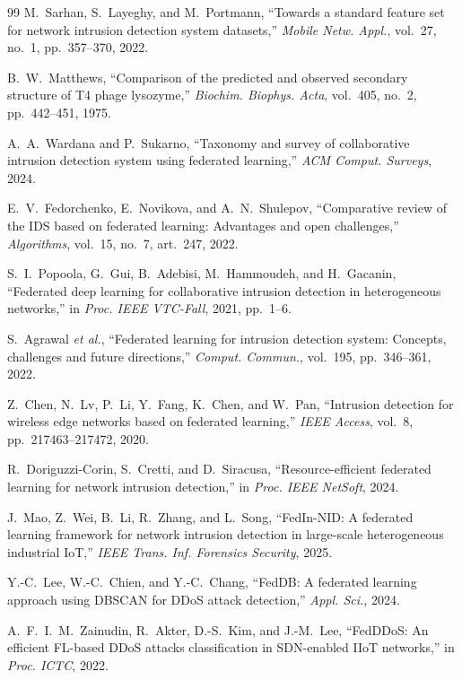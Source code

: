 \documentclass[11pt,a4paper]{article}
\begin{document}
\begin{thebibliography}{99}
M.~Sarhan, S.~Layeghy, and M.~Portmann, ``Towards a standard feature set for
network intrusion detection system datasets,'' \emph{Mobile Netw. Appl.},
vol.~27, no.~1, pp.~357--370, 2022.

B.~W.~Matthews, ``Comparison of the predicted and observed secondary structure of
T4 phage lysozyme,'' \emph{Biochim. Biophys. Acta}, vol.~405, no.~2,
pp.~442--451, 1975.

A.~A.~Wardana and P.~Sukarno, ``Taxonomy and survey of collaborative intrusion
detection system using federated learning,'' \emph{ACM Comput. Surveys}, 2024.

E.~V.~Fedorchenko, E.~Novikova, and A.~N.~Shulepov, ``Comparative review of the
IDS based on federated learning: Advantages and open challenges,''
\emph{Algorithms}, vol.~15, no.~7, art.~247, 2022.

S.~I.~Popoola, G.~Gui, B.~Adebisi, M.~Hammoudeh, and H.~Gacanin, ``Federated deep
learning for collaborative intrusion detection in heterogeneous networks,'' in
\emph{Proc. IEEE VTC-Fall}, 2021, pp.~1--6.

S.~Agrawal \emph{et al.}, ``Federated learning for intrusion detection system:
Concepts, challenges and future directions,'' \emph{Comput. Commun.}, vol.~195,
pp.~346--361, 2022.

Z.~Chen, N.~Lv, P.~Li, Y.~Fang, K.~Chen, and W.~Pan, ``Intrusion detection for
wireless edge networks based on federated learning,'' \emph{IEEE Access}, vol.~8,
pp.~217463--217472, 2020.

R.~Doriguzzi-Corin, S.~Cretti, and D.~Siracusa, ``Resource-efficient federated
learning for network intrusion detection,'' in \emph{Proc. IEEE NetSoft}, 2024.

J.~Mao, Z.~Wei, B.~Li, R.~Zhang, and L.~Song, ``FedIn-NID: A federated learning
framework for network intrusion detection in large-scale heterogeneous industrial
IoT,'' \emph{IEEE Trans. Inf. Forensics Security}, 2025.

Y.-C.~Lee, W.-C.~Chien, and Y.-C.~Chang, ``FedDB: A federated learning approach
using DBSCAN for DDoS attack detection,'' \emph{Appl. Sci.}, 2024.

A.~F.~I.~M.~Zainudin, R.~Akter, D.-S.~Kim, and J.-M.~Lee, ``FedDDoS: An efficient
FL-based DDoS attacks classification in SDN-enabled IIoT networks,'' in
\emph{Proc. ICTC}, 2022.


\end{thebibliography}
\end{document}
